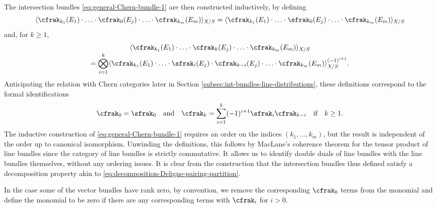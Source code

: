 The intersection bundles \eqref{eq:general-Chern-bundle-1} are then constructed inductively, by defining\vspace*{-3pt}
\begin{displaymath}
\langle \cfrak_{k_1}(E_1) \cdot \ldots \cdot \cfrak_0(E_j) \cdot \ldots \cdot \cfrak_{k_m}(E_m) \rangle_{X/S} = \langle \cfrak_{k_1}(E_1) \cdot \ldots \cdot \sfrak_0(E_j) \cdot \ldots \cdot \cfrak_{k_m}(E_m) \rangle_{X/S}
\end{displaymath}
and, for $k \geq 1$,\vspace*{-5pt}
\begin{multline*}
\langle \cfrak_{k_1}(E_1) \cdot \ldots \cdot \cfrak_k(E_j) \cdot \ldots \cdot \cfrak_{k_m}(E_m) \rangle_{X/S}\\[-3pt]
= \bigotimes_{i=1}^{k} \langle \cfrak_{k_1}(E_1) \cdot \ldots \cdot \sfrak_i(E_j) \cdot \cfrak_{k-i}(E_j) \cdot \ldots \cdot \cfrak_{k_m}(E_m) \rangle_{X/S}^{(-1)^{i+1}}.
\end{multline*}
Anticipating the relation with Chern categories later in Section \ref{subsec:int-bundles-line-distributions}, these definitions correspond to the formal identifications\vspace*{-3pt}
\begin{equation}\label{eq:definition-chern-classes}
\cfrak_0=\sfrak_0 \quad\text{and}\quad \cfrak_k = \sum_{i=1}^{k} (-1)^{i+1} \sfrak_i \cfrak_{k-i}\quad\text{if}\quad k\geq 1.
\end{equation}
The inductive construction of \eqref{eq:general-Chern-bundle-1} requires an order on the indices $(k_{1},\ldots, k_{m})$, but the result is independent of the order up to canonical isomorphism. Unwinding the definitions, this follows by MacLane's coherence theorem for the tensor product of line bundles since the category of line bundles is strictly commutative. It allows us to identify double duals of line bundles with the line bundles themselves, without any ordering issues.
It is clear from the construction that the intersection bundles thus defined satisfy a decomposition property akin to \eqref{eq:decomposition-Deligne-pairing-partition}.

In the case some of the vector bundles have rank zero, by convention, we remove the corresponding $\cfrak_0$ terms from the monomial and define the monomial to be zero if there are any corresponding terms with $\cfrak_i$ for $i > 0$.

